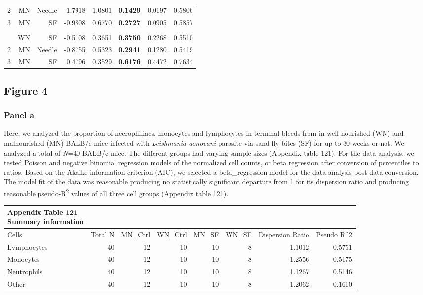 \documentclass[
  12pt,
  letterpaper,
]{article}
\begin{document}
\begin{longtable}{rrrrrrrr}
2 & MN & Needle & -1.7918 & 1.0801 & {\bfseries 0.1429} & 0.0197 & 0.5806 \\ 
3 & MN & SF & -0.9808 & 0.6770 & {\bfseries 0.2727} & 0.0905 & 0.5857 \\ 
\midrule\addlinespace[2.5pt]
\multicolumn{8}{l}{Spleen} \\[2.5pt] 
\midrule\addlinespace[2.5pt]
1 & WN & SF & -0.5108 & 0.3651 & {\bfseries 0.3750} & 0.2268 & 0.5510 \\ 
2 & MN & Needle & -0.8755 & 0.5323 & {\bfseries 0.2941} & 0.1280 & 0.5419 \\ 
3 & MN & SF & 0.4796 & 0.3529 & {\bfseries 0.6176} & 0.4472 & 0.7634 \\ 
\bottomrule
\end{longtable}
\endgroup

\subsection{Figure 4}\label{figure-4}

\subsubsection{Panel a}\label{panel-a-2}

Here, we analyzed the proportion of necrophiliacs, monocytes and lymphocytes in terminal bleeds from in well-nourished (WN) and malnourished (MN) BALB/c mice infected with \emph{Leishmania donovani} parasite via sand fly bites (SF) for up to 30 weeks or not. We analyzed a total of \emph{N}=40 BALB/c mice. The different groups had varying sample sizes (Appendix table 121). For the data analysis, we tested Poisson and negative binomial regression models of the normalized cell counts, or beta regression after conversion of percentiles to ratios. Based on the Akaike information criterion (AIC), we selected a beta\_regression model for the data analysis post data conversion. The model fit of the data was reasonable producing no statistically significant departure from 1 for its dispersion ratio and producing reasonable pseudo-R\textsuperscript{2} values of all three cell groups (Appendix table 121).

\begingroup
\fontsize{12.0pt}{14.4pt}\selectfont
\begin{longtable}{l|rrrrrrr}
\caption*{
{\large \textbf{Appendix Table 121}} \\ 
{\small \textbf{Summary information}}
} \\ 
\toprule
Cells & {Total N} & MN\_Ctrl & WN\_Ctrl & MN\_SF & WN\_SF & {Dispersion Ratio} & Pseudo R\textasciicircum{}2 \\ 
\midrule\addlinespace[2.5pt]
Lymphocytes & 40 & 12 & 10 & 10 & 8 & 1.1012 & 0.5751 \\ 
Monocytes & 40 & 12 & 10 & 10 & 8 & 1.2556 & 0.5175 \\ 
Neutrophils & 40 & 12 & 10 & 10 & 8 & 1.1267 & 0.5146 \\ 
Other & 40 & 12 & 10 & 10 & 8 & 1.2062 & 0.1610 \\ 
\bottomrule
\end{longtable}
\endgroup
\end{document}
